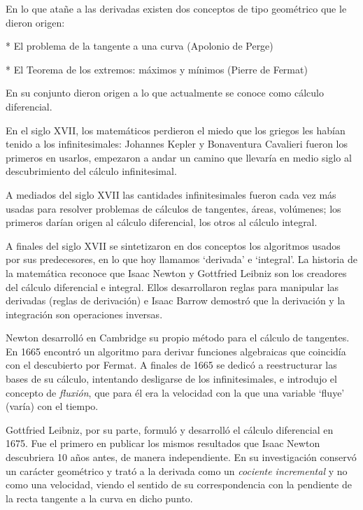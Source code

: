 	En lo que atañe a las derivadas existen dos conceptos de tipo geométrico que le dieron origen:
	

		\hspace{5mm} * El problema de la tangente a una curva (Apolonio de Perge)
		
		\hspace{5mm} * El Teorema de los extremos: máximos y mínimos (Pierre de Fermat)
	
	En su conjunto dieron origen a lo que actualmente se conoce como cálculo diferencial.
	
	
	En el siglo XVII, los matemáticos perdieron el miedo que los griegos les habían tenido a los infinitesimales: Johannes Kepler y Bonaventura Cavalieri fueron los primeros en usarlos, empezaron a andar un camino que llevaría en medio siglo al descubrimiento del cálculo infinitesimal.
	
	A mediados del siglo XVII las cantidades infinitesimales fueron cada vez más usadas para resolver problemas de cálculos de tangentes, áreas, volúmenes; los primeros darían origen al cálculo diferencial, los otros al cálculo integral.

	A finales del siglo XVII se sintetizaron en dos conceptos los algoritmos usados por sus predecesores, en lo que hoy llamamos `derivada' e `integral'. La historia de la matemática reconoce que Isaac Newton y Gottfried Leibniz son los creadores del cálculo diferencial e integral. Ellos desarrollaron reglas para manipular las derivadas (reglas de derivación) e Isaac Barrow demostró que la derivación y la integración son operaciones inversas.
	

	Newton desarrolló en Cambridge su propio método para el cálculo de tangentes. En 1665 encontró un algoritmo para derivar funciones algebraicas que coincidía con el descubierto por Fermat. A finales de 1665 se dedicó a reestructurar las bases de su cálculo, intentando desligarse de los infinitesimales, e introdujo el concepto de \emph{fluxión}, que para él era la velocidad con la que una variable `fluye' (varía) con el tiempo.

	Gottfried Leibniz, por su parte, formuló y desarrolló el cálculo diferencial en 1675. Fue el primero en publicar los mismos resultados que Isaac Newton descubriera 10 años antes, de manera independiente. En su investigación conservó un carácter geométrico y trató a la derivada como un \emph{cociente incremental} y no como una velocidad, viendo el sentido de su correspondencia con la pendiente de la recta tangente a la curva en dicho punto.
	
